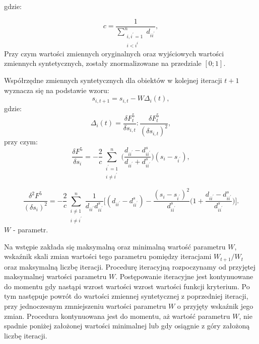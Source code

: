 \documentclass[12pt,a4paper]{report}
\begin{document}
gdzie:

\begin{equation}
c=\frac{1}{\sum_{\substack{i,i^{'}=1 \\ i<i^{i}}}^n d_{ii^{'}}},
\end{equation}
Przy czym wartości zmiennych oryginalnych oraz wyjściowych wartości zmiennych syntetycznych, zostały znormalizowane na przedziale $[0;1]$.

Współrzędne zmiennych syntetycznych dla obiektów w kolejnej iteracji $t+1$ wyznacza się na podstawie wzoru:
\begin{equation}
s_{i,t+1}=s_{i,t} - W\Delta_{i}(t),
\end{equation}
gdzie:
\begin{equation}
\Delta_{i}(t)=\frac{\delta F_{t}^{5}}{\delta s_{i,t}} : \frac{\delta F_{t}^{5}}{(\delta s_{i,t})^{2}},
\end{equation}
przy czym:
\begin{equation}
\frac{\delta F^{5}}{\delta s_{i}}=-\frac{2}{c}\sum_{\substack{i^{'}=1 \\ i \neq i^{'}}}^n \bigg( \frac{d_{ii^{'}} - d_{ii^{'}}^s}{d_{ii^{'}}+d_{ii^{'}}^{s}} \bigg)(s_{i} - s_{i^{'}}),
\end{equation}

\begin{equation}
\frac{\delta^2 F^{5}}{(\delta s_{i})^{2}}=-\frac{2}{c}\sum_{\substack{i\neq1 \\ i \neq i^{'}}}^n \frac{1}{d_{ii^{'}}d_{ii^{'}}^{s}} \bigg[ (d_{ii^{'}} - d_{ii^{'}}^s) - \frac{(s_i - s_{i^{'}})^2}{d_{ii^{'}}^s} \bigg( 1+ \frac{d_{ii^{'}}-d_{ii^{'}}^{s}}{d_{ii^{'}}^s} \bigg) \bigg].
\end{equation}
\newline
$W$ - parametr.

Na wstępie zakłada się maksymalną oraz minimalną wartość parametru $W$, wskaźnik skali zmian wartości tego parametru pomiędzy iteracjami $W_{t+1}/W_{t}$ oraz maksymalną liczbę iteracji. Procedurę iteracyjną rozpoczynamy od przyjętej maksymalnej wartości parametru $W$. Postępowanie iteracyjne jest kontynuowane do momentu gdy nastąpi wzrost wartości wzrost wartości funkcji kryterium. Po tym następuje powrót do wartości zmiennej syntetycznej z poprzedniej iteracji, przy jednoczesnym zmniejszeniu wartości parametru $W$ o przyjęty wskaźnik jego zmian. Procedura kontynuowana jest do momentu, aż wartość parametru $W$, nie spadnie poniżej założonej wartości minimalnej lub gdy osiągnie z góry założoną liczbę iteracji. 
\end{document}
